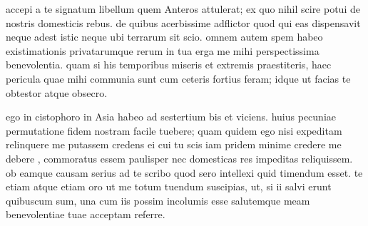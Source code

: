 


 accepi a te signatum libellum quem Anteros attulerat; ex quo nihil scire potui de nostris domesticis rebus. de quibus acerbissime adflictor quod qui eas dispensavit neque adest istic neque ubi terrarum sit scio. omnem autem spem habeo existimationis privatarumque rerum in tua erga me mihi perspectissima benevolentia. quam si his temporibus miseris et extremis praestiteris, haec pericula quae mihi communia sunt cum ceteris fortius feram; idque ut facias te obtestor atque obsecro.

 ego in cistophoro in Asia habeo ad sestertium bis et viciens. huius pecuniae permutatione fidem nostram facile tuebere; quam quidem ego nisi expeditam relinquere me putassem credens ei cui tu scis iam pridem minime credere me debere , commoratus essem paulisper nec domesticas res impeditas reliquissem. ob eamque causam serius ad te scribo quod sero intellexi quid timendum esset. te etiam atque etiam oro ut me totum tuendum suscipias, ut, si ii salvi erunt quibuscum sum, una cum iis possim incolumis esse salutemque meam benevolentiae tuae acceptam referre.
